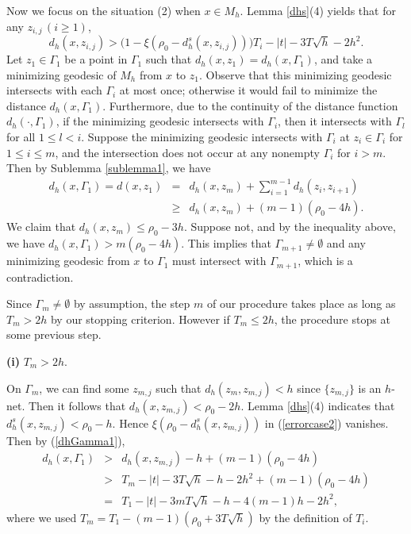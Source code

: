 \documentclass[11pt,letterpaper]{amsart}
\numberwithin{equation}{section}
\theoremstyle{definition}
\theoremstyle{plain}
\theoremstyle{definition}
\theoremstyle{plain}
\theoremstyle{definition}
\theoremstyle{plain}
\begin{document}
\smallskip
Now we focus on the situation (2) when $x\in M_h$. Lemma \ref{dhs}(4) yields that for any $z_{i,j}\,(i\geqslant 1)$,
\begin{equation}\label{errorcase2}
d_h(x,z_{i,j})> \big(1-\xi(\rho_0-d_h^s(x,z_{i,j}))\big)T_i-|t|-3T\sqrt{h}-2h^2.
\end{equation}
Let $z_1\in \Gamma_1$ be a point in $\Gamma_1$ such that $d_h(x,z_1)=d_h(x,\Gamma_1)$, and take a minimizing geodesic of $M_h$ from $x$ to $z_1$. Observe that this minimizing geodesic intersects with each $\Gamma_i$ at most once; otherwise it would fail to minimize the distance $d_h(x,\Gamma_1)$. Furthermore, due to the continuity of the distance function $d_h(\cdot,\Gamma_1)$, if the minimizing geodesic intersects with $\Gamma_i$, then it intersects with $\Gamma_l$ for all $1\leqslant l<i$.
Suppose the minimizing geodesic intersects with $\Gamma_i$ at $z_i\in\Gamma_i$ for $1\leqslant i\leqslant m$, and the intersection does not occur at any nonempty $\Gamma_i$ for $i>m$. Then by Sublemma \ref{sublemma1}, we have
\begin{eqnarray}\label{dhGamma1}
d_h(x,\Gamma_1)=d(x,z_1)&=&d_h(x,z_m)+\sum_{i=1}^{m-1}d_h(z_i,z_{i+1}) \nonumber \\
&\geqslant& d_h(x,z_{m})+(m-1)(\rho_0-4h).
\end{eqnarray}
We claim that $d_h(x,z_m)\leqslant \rho_0-3h$. Suppose not, and by the inequality above, we have $d_h(x,\Gamma_1)>m(\rho_0-4h)$. This implies that $\Gamma_{m+1}\neq\emptyset$ and any minimizing geodesic from $x$ to $\Gamma_1$ must intersect with $\Gamma_{m+1}$, which is a contradiction.

Since $\Gamma_m\neq\emptyset$ by assumption, the step $m$ of our procedure takes place as long as $T_m>2h$ by our stopping criterion. However if $T_m\leqslant 2h$, the procedure stops at some previous step.

\smallskip
\noindent \textbf{(i)} $T_m>2h$.

On $\Gamma_m$, we can find some $z_{m,j}$ such that $d_h(z_m,z_{m,j})<h$ since $\{z_{m,j}\}$ is an $h$-net. Then it follows that $d_h(x,z_{m,j})<\rho_0-2h$. Lemma \ref{dhs}(4) indicates that $d_h^s(x,z_{m,j})<\rho_0-h$. Hence $\xi(\rho_0-d_h^s(x,z_{m,j}))$ in (\ref{errorcase2}) vanishes. Then by (\ref{dhGamma1}),
\begin{eqnarray*}
d_h(x,\Gamma_1)&>& d_h(x,z_{m,j})-h+(m-1)(\rho_0-4h) \\
&>& T_m-|t|-3T\sqrt{h}-h-2h^2+(m-1)(\rho_0-4h) \\
&=& T_1-|t|-3mT\sqrt{h}-h-4(m-1)h-2h^2,
\end{eqnarray*}
where we used $T_m=T_1-(m-1)(\rho_0+3T\sqrt{h})$ by the definition of $T_i$. 
\end{document}
